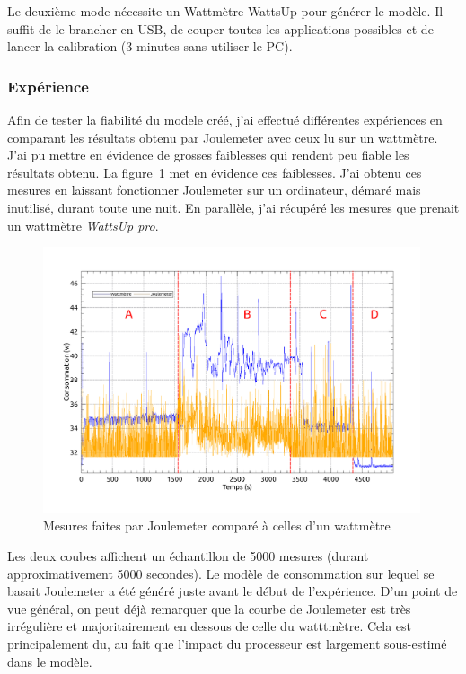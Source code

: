 \documentclass[a4paper, 11pt]{report}
\begin{document}
Le deuxième mode nécessite un Wattmètre WattsUp pour générer le modèle. Il suffit de le brancher en USB, de couper toutes les applications possibles et de lancer la calibration (3 minutes sans utiliser le PC).

\subsubsection{Expérience}
Afin de tester la fiabilité du modele créé, j'ai effectué différentes expériences en comparant les résultats obtenu par Joulemeter avec ceux lu sur un wattmètre. J'ai pu mettre en évidence de grosses faiblesses qui rendent peu fiable les résultats obtenu. La figure~\ref{joulemeter} met en évidence ces faiblesses. J'ai obtenu ces mesures en laissant fonctionner Joulemeter sur un ordinateur, démaré mais inutilisé, durant toute une nuit. En parallèle, j'ai récupéré les mesures que prenait un wattmètre \textit{WattsUp pro}.

\begin{figure}
	\includegraphics[width=0.99\textwidth]{figures/joulemeter.pdf}
	\caption{Mesures faites par Joulemeter comparé à celles d'un wattmètre}
	\label{joulemeter}
\end{figure}

Les deux coubes affichent un échantillon  de 5000 mesures (durant approximativement 5000 secondes). Le modèle de consommation sur lequel se basait Joulemeter a été généré juste avant le début de l'expérience. D'un point de vue général, on peut déjà remarquer que la courbe de Joulemeter est très irrégulière et majoritairement en dessous de celle du watttmètre. Cela est principalement du, au fait que l'impact du processeur est largement sous-estimé dans le modèle.
\end{document}
